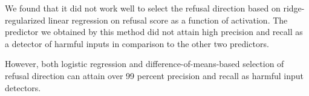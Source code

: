 \documentclass[10pt,letterpaper]{article}
\begin{document}
We found that it did not work well to select the refusal direction based on ridge-regularized linear regression on refusal score as a function of activation. The predictor we obtained by this method did not attain high precision and recall as a detector of harmful inputs in comparison to the other two predictors.

However, both logistic regression and difference-of-means-based selection of refusal direction can attain over 99 percent precision and recall as harmful input detectors.
\end{document}
